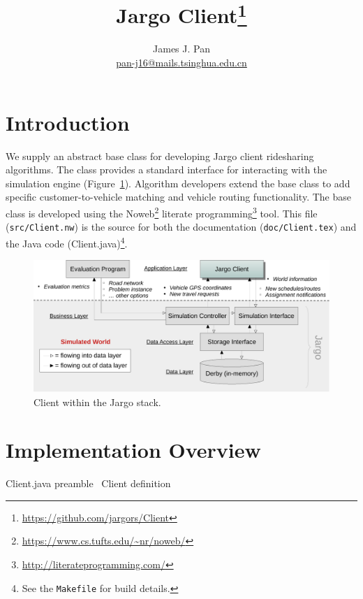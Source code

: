 \documentclass{article}
\title{Jargo Client\footnote{
    \url{https://github.com/jargors/Client}}}
\author{James J. Pan\\
  \small{\href{mailto:pan-j16@mails.tsinghua.edu.cn}{pan-j16@mails.tsinghua.edu.cn}}}
\def\nwendcode{\endtrivlist \endgroup}      %
\let\nwdocspar=\par
\begin{document}
\maketitle
\pagestyle{noweb}

\tableofcontents

\section{Introduction}
\label{sec:introduction}
We supply an abstract base class for developing Jargo client ridesharing
algorithms. The class provides a standard interface for interacting with the
simulation engine (Figure~\ref{fig:client}). Algorithm developers extend the
base class to add specific customer-to-vehicle matching and vehicle routing
functionality.  The base class is developed using the
Noweb\footnote{\url{https://www.cs.tufts.edu/~nr/noweb/}} literate
programming\footnote{\url{http://literateprogramming.com/}} tool.  This file
({\tt{}src/Client.nw}) is the source for both the documentation
({\tt{}doc/Client.tex}) and the Java code (Client.java)\footnote{See the
{\tt{}Makefile} for build details.}.

\begin{figure}[h]
\centering
\includegraphics[width=150mm]{src/fig/client-fig}
\caption{Client within the Jargo stack.}
\label{fig:client}
\end{figure}

\section{Implementation Overview}
\endmoddef{}
\LA{}Client.java preamble~{\nwtagstyle{}}\RA{}
\LA{}\code{}Client\edoc{} definition~{\nwtagstyle{}}\RA{}
\nwendcode{}\nwdocspar
\end{document}
